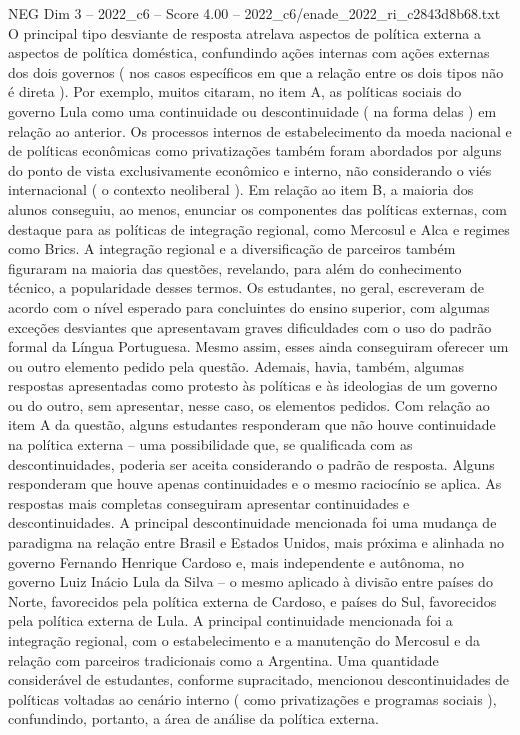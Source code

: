 \begin{textsample}{NEG Dim 3 – 2022\_c6 – Score 4.00 – 2022\_c6/enade\_2022\_ri\_c2843d8b68.txt}
O principal tipo desviante de resposta atrelava aspectos de política externa a aspectos de política doméstica, confundindo ações internas com ações externas dos dois governos ( nos casos específicos em que a relação entre os dois tipos não é direta ).
Por exemplo, muitos citaram, no item A, as políticas sociais do governo Lula como uma continuidade ou descontinuidade ( na forma delas ) em relação ao anterior.
Os processos internos de estabelecimento da moeda nacional e de políticas econômicas como privatizações também foram abordados por alguns do ponto de vista exclusivamente econômico e interno, não considerando o viés internacional ( o contexto neoliberal ).
Em relação ao item B, a maioria dos alunos conseguiu, ao menos, enunciar os componentes das políticas externas, com destaque para as políticas de integração regional, como Mercosul e Alca e regimes como Brics.
A integração regional e a diversificação de parceiros também figuraram na maioria das questões, revelando, para além do conhecimento técnico, a popularidade desses termos.
Os estudantes, no geral, escreveram de acordo com o nível esperado para concluintes do ensino superior, com algumas exceções desviantes que apresentavam graves dificuldades com o uso do padrão formal da Língua Portuguesa.
Mesmo assim, esses ainda conseguiram oferecer um ou outro elemento pedido pela questão.
Ademais, havia, também, algumas respostas apresentadas como protesto às políticas e às ideologias de um governo ou do outro, sem apresentar, nesse caso, os elementos pedidos.
Com relação ao item A da questão, alguns estudantes responderam que não houve continuidade na política externa – uma possibilidade que, se qualificada com as descontinuidades, poderia ser aceita considerando o padrão de resposta.
Alguns responderam que houve apenas continuidades e o mesmo raciocínio se aplica.
As respostas mais completas conseguiram apresentar continuidades e descontinuidades.
A principal descontinuidade mencionada foi uma mudança de paradigma na relação entre Brasil e Estados Unidos, mais próxima e alinhada no governo Fernando Henrique Cardoso e, mais independente e autônoma, no governo Luiz Inácio Lula da Silva – o mesmo aplicado à divisão entre países do Norte, favorecidos pela política externa de Cardoso, e países do Sul, favorecidos pela política externa de Lula.
A principal continuidade mencionada foi a integração regional, com o estabelecimento e a manutenção do Mercosul e da relação com parceiros tradicionais como a Argentina.
Uma quantidade considerável de estudantes, conforme supracitado, mencionou descontinuidades de políticas voltadas ao cenário interno ( como privatizações e programas sociais ), confundindo, portanto, a área de análise da política externa.

\end{textsample}
